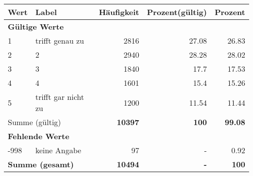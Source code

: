      \begin{longtable}{lXrrr}
     \toprule
     \textbf{Wert} & \textbf{Label} & \textbf{Häufigkeit} & \textbf{Prozent(gültig)} & \textbf{Prozent} \\
     \endhead
     \midrule
     \multicolumn{5}{l}{\textbf{Gültige Werte}}\\

     1 &
     \multicolumn{1}{X}{ trifft genau zu   } &


       \num{2816} &
       \num[round-mode=places,round-precision=2]{27.08} &
         \num[round-mode=places,round-precision=2]{26.83} \\

     2 &
     \multicolumn{1}{X}{ 2   } &


       \num{2940} &
       \num[round-mode=places,round-precision=2]{28.28} &
         \num[round-mode=places,round-precision=2]{28.02} \\

     3 &
     \multicolumn{1}{X}{ 3   } &


       \num{1840} &
       \num[round-mode=places,round-precision=2]{17.7} &
         \num[round-mode=places,round-precision=2]{17.53} \\

     4 &
     \multicolumn{1}{X}{ 4   } &


       \num{1601} &
       \num[round-mode=places,round-precision=2]{15.4} &
         \num[round-mode=places,round-precision=2]{15.26} \\

     5 &
     \multicolumn{1}{X}{ trifft gar nicht zu   } &


       \num{1200} &
       \num[round-mode=places,round-precision=2]{11.54} &
         \num[round-mode=places,round-precision=2]{11.44} \\
     \midrule
     \multicolumn{2}{l}{Summe (gültig)} &
       \textbf{\num{10397}} &
     \textbf{\num{100}} &
       \textbf{\num[round-mode=places,round-precision=2]{99.08}} \\
     \multicolumn{5}{l}{\textbf{Fehlende Werte}}\\
       -998 &
       keine Angabe &
         \num{97} &
        - &
         \num[round-mode=places,round-precision=2]{0.92} \\
     \midrule
     \multicolumn{2}{l}{\textbf{Summe (gesamt)}} &
          \textbf{\num{10494}} &
        \textbf{-} &
        \textbf{\num{100}} \\
     \bottomrule
     \end{longtable}
     
